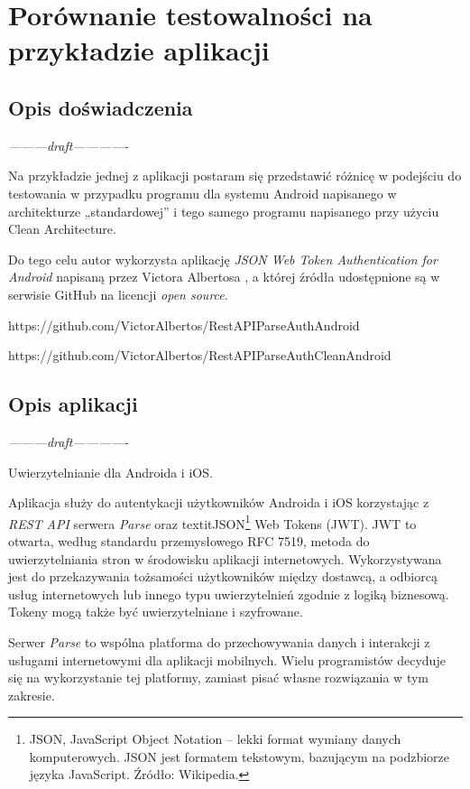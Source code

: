 \chapter{Porównanie testowalności na przykładzie aplikacji}
\label{analiza_testow}

\section{Opis doświadczenia}
\textit{---------draft-------------}

Na przykładzie jednej z aplikacji postaram się przedstawić różnicę w podejściu do testowania w przypadku programu dla systemu Android napisanego w architekturze „standardowej” i tego samego programu napisanego przy użyciu Clean Architecture.

Do tego celu autor wykorzysta aplikację \textit{JSON Web Token Authentication for Android} napisaną przez Victora Albertosa , a której źródła udostępnione są w serwisie GitHub na licencji \textit{open source}. 

https://github.com/VictorAlbertos/RestAPIParseAuthAndroid

https://github.com/VictorAlbertos/RestAPIParseAuthCleanAndroid

\section{Opis aplikacji}
\textit{---------draft-------------}

Uwierzytelnianie dla Androida i iOS. 

Aplikacja służy do autentykacji użytkowników Androida i iOS korzystając z \textit{REST API} serwera \textit{Parse} oraz textit{JSON\footnote{JSON, JavaScript Object Notation – lekki format wymiany danych komputerowych. JSON jest formatem tekstowym, bazującym na podzbiorze języka JavaScript. Źródło: Wikipedia.} Web Tokens (JWT)}. JWT to otwarta, według standardu przemysłowego RFC 7519\cite{website:jwt:rfc7519}, metoda do uwierzytelniania stron w środowisku aplikacji internetowych. Wykorzystywana jest do przekazywania tożsamości użytkowników między dostawcą, a odbiorcą usług internetowych lub innego typu uwierzytelnień zgodnie z logiką biznesową. Tokeny mogą także być uwierzytelniane i szyfrowane. 

Serwer \textit{Parse} to wspólna platforma do przechowywania danych i interakcji z usługami internetowymi dla aplikacji mobilnych. Wielu programistów decyduje się na wykorzystanie tej platformy, zamiast pisać własne rozwiązania w tym zakresie.

